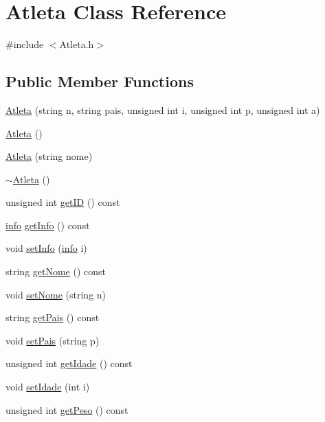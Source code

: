 \hypertarget{class_atleta}{}\section{Atleta Class Reference}
\label{class_atleta}


{\ttfamily \#include $<$Atleta.\+h$>$}

\subsection*{Public Member Functions}
\begin{DoxyCompactItemize}
\item 
\hyperlink{class_atleta_abd3d28e4321bd53ed8aa9c840a2278f1}{Atleta} (string n, string pais, unsigned int i, unsigned int p, unsigned int a)
\item 
\hyperlink{class_atleta_af1b4e011c71918d9c59b910afa88d64e}{Atleta} ()
\item 
\hyperlink{class_atleta_aad4fa6df8be392afed8498cfdc446e3e}{Atleta} (string nome)
\item 
\hyperlink{class_atleta_a6002feaeb345f754cdfde63987815dd2}{$\sim$\+Atleta} ()
\item 
unsigned int \hyperlink{class_atleta_a95ff067c6a7e3268425bfc97adf72171}{get\+I\+D} () const 
\item 
\hyperlink{structinfo}{info} \hyperlink{class_atleta_af8076b0fe0d69e6313685f1b3d7be27c}{get\+Info} () const 
\item 
void \hyperlink{class_atleta_ada229ccfc2a898c893c0a34c9c996892}{set\+Info} (\hyperlink{structinfo}{info} i)
\item 
string \hyperlink{class_atleta_a0f5be5cd0b18f224a7a5281216fc1bfd}{get\+Nome} () const 
\item 
void \hyperlink{class_atleta_a35fcdb190f9b6b5100fba23cc98e5304}{set\+Nome} (string n)
\item 
string \hyperlink{class_atleta_a6b19798bf0eca5caed86134b7932264d}{get\+Pais} () const 
\item 
void \hyperlink{class_atleta_a3a4c881326e44433537d44727d7d60de}{set\+Pais} (string p)
\item 
unsigned int \hyperlink{class_atleta_ad0a209bea90007c372d07465cb410fbc}{get\+Idade} () const 
\item 
void \hyperlink{class_atleta_a62b5097c74ad66181a05d6562c1a9a25}{set\+Idade} (int i)
\item 
unsigned int \hyperlink{class_atleta_aade1b300b0ed29445f63bed20392888c}{get\+Peso} () const 

\end{DoxyCompactItemize}
